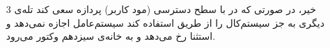 \begin{itemize}
	\item [3] 
	خیر، در صورتی که در با سطح دسترسی 
	 (مود کاربر) پردازه سعی کند تله‌ی دیگری به جز سیستم‌کال را از طریق 
	  استفاده کند سیستم‌عامل اجازه نمی‌دهد و استثنا رخ می‌دهد و به خانه‌ی سیزدهم وکتور می‌رود.
\end{itemize}